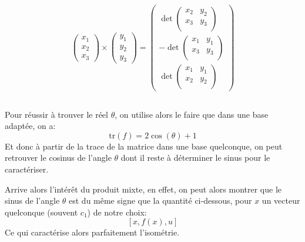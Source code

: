 \[
   \begin{pmatrix}
      x_1 \\
      x_2 \\
      x_3  
   \end{pmatrix}\times 
   \begin{pmatrix}
      y_1 \\
      y_2 \\
      y_3  
   \end{pmatrix} = 
   \begin{pmatrix}
      \det\begin{pmatrix}
         x_2 & y_2 \\
         x_3 & y_3 \\
      \end{pmatrix} \\
      -\det\begin{pmatrix}
         x_1 & y_1 \\
         x_3 & y_3 \\
      \end{pmatrix} \\
      \det\begin{pmatrix}
         x_1 & y_1 \\
         x_2 & y_2 \\
      \end{pmatrix}  
   \end{pmatrix}
\]

\subsection*{}
Pour réussir à trouver le réel \(\theta\), on utilise alors le faire que dans une base adaptée, on a:
\[
   \text{tr}(f) = 2\cos(\theta) + 1    
\]
Et donc à partir de la trace de la matrice dans une base quelconque, on peut retrouver le cosinus de l'angle \(\theta\) dont il reste à déterminer le sinus pour le caractériser.\<

Arrive alors l'intérêt du produit mixte, en effet, on peut alors montrer que le sinus de l'angle \(\theta\) est du même signe que la quantité ci-dessous, pour \(x\) un vecteur quelconque (souvent \(c_1\)) de notre choix:
\[
   [x, f(x), u]   
\]
Ce qui caractérise alors parfaitement l'isométrie.

